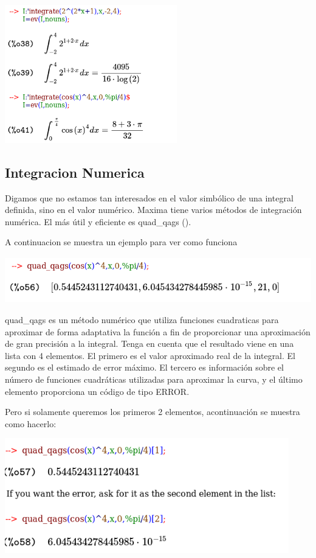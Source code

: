 \documentclass{article}
\begin{document}
\begin{center}
\includegraphics[height=6cm]{fto29.png}
\end{center}


\subsection{Integracion Numerica}


Digamos que no estamos tan interesados en el valor simbólico de una integral definida, sino en el valor numérico. Maxima tiene varios métodos de integración numérica. El más útil y eficiente es quad\_qags ().

A continuacion se muestra un ejemplo para ver como funciona


\begin{center}
\includegraphics[height=2cm]{fto30.png}
\end{center}


quad\_qags es un método numérico que utiliza funciones cuadraticas para aproximar de forma adaptativa la función a fin de proporcionar una aproximación de gran precisión a la integral. Tenga en cuenta que el resultado viene en una lista con 4 elementos. El primero es el valor aproximado real de la integral. El segundo es el estimado de error máximo. El tercero es información sobre el número de funciones cuadráticas utilizadas para aproximar la curva, y el último elemento proporciona un código de tipo ERROR.

Pero si solamente queremos  los primeros 2 elementos, acontinuación se muestra como hacerlo:


\begin{center}
\includegraphics[height=5cm]{fto31.png}
\end{center}
\end{document}
